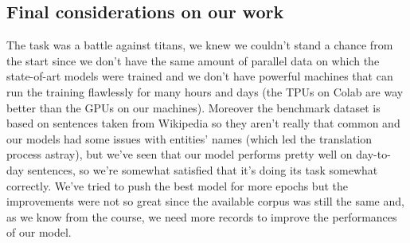 \subsection{Final considerations on our work}
The task was a battle against titans, we knew we couldn't stand a chance from the start since we don't have the same amount of parallel data on which the state-of-art models were trained and we don't have powerful machines that can run the training flawlessly for many hours and days (the TPUs on Colab are way better than the GPUs on our machines). Moreover the benchmark dataset is based on sentences taken from Wikipedia so they aren't really that common and our models had some issues with entities' names (which led the translation process astray), but we've seen that our model performs pretty well on day-to-day sentences, so we're somewhat satisfied that it's doing its task somewhat correctly. We've tried to push the best model for more epochs but the improvements were not so great since the available corpus was still the same and, as we know from the course, we need more records to improve the performances of our model.
\vspace{3mm}
